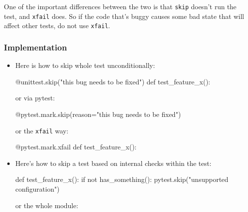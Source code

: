 \documentclass[
]{report}
\newenvironment{Shaded}{\begin{snugshade}}{\end{snugshade}}
\newcommand{\AttributeTok}[1]{\textcolor[rgb]{0.40,0.45,0.13}{#1}}
\newcommand{\ControlFlowTok}[1]{\textcolor[rgb]{0.00,0.23,0.31}{#1}}
\newcommand{\KeywordTok}[1]{\textcolor[rgb]{0.00,0.23,0.31}{#1}}
\newcommand{\NormalTok}[1]{\textcolor[rgb]{0.00,0.23,0.31}{#1}}
\newcommand{\OperatorTok}[1]{\textcolor[rgb]{0.37,0.37,0.37}{#1}}
\newcommand{\StringTok}[1]{\textcolor[rgb]{0.13,0.47,0.30}{#1}}
\begin{document}
One of the important differences between the two is that \texttt{skip}
doesn't run the test, and \texttt{xfail} does. So if the code that's
buggy causes some bad state that will affect other tests, do not use
\texttt{xfail}.

\subsubsection{Implementation}\label{implementation}

\begin{itemize}
\item
  Here is how to skip whole test unconditionally:

\begin{Shaded}
\begin{Highlighting}[]
\AttributeTok{@unittest.skip}\NormalTok{(}\StringTok{"this bug needs to be fixed"}\NormalTok{)}
\KeywordTok{def}\NormalTok{ test\_feature\_x():}
\end{Highlighting}
\end{Shaded}

  or via pytest:

\begin{Shaded}
\begin{Highlighting}[]
\AttributeTok{@pytest.mark.skip}\NormalTok{(reason}\OperatorTok{=}\StringTok{"this bug needs to be fixed"}\NormalTok{)}
\end{Highlighting}
\end{Shaded}

  or the \texttt{xfail} way:

\begin{Shaded}
\begin{Highlighting}[]
\AttributeTok{@pytest.mark.xfail}
\KeywordTok{def}\NormalTok{ test\_feature\_x():}
\end{Highlighting}
\end{Shaded}
\item
  Here's how to skip a test based on internal checks within the test:

\begin{Shaded}
\begin{Highlighting}[]
\KeywordTok{def}\NormalTok{ test\_feature\_x():}
    \ControlFlowTok{if} \KeywordTok{not}\NormalTok{ has\_something():}
\NormalTok{        pytest.skip(}\StringTok{"unsupported configuration"}\NormalTok{)}
\end{Highlighting}
\end{Shaded}

  or the whole module:


\end{itemize}
\end{document}
